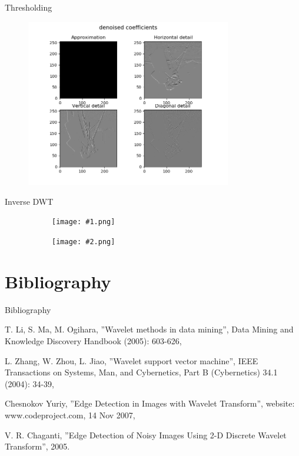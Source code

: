 \documentclass{beamer}
\newcommand{\1}[1]{\mathds{1}\left(#1\right)}
\newenvironment{diagrams}[2]{\begin{figure}[p]
		\begin{subfigure}{.49\textwidth}
			\centering
			\texttt{[image: \#1.png]}
			\caption{}
			\label{#1}
		\end{subfigure}
		\begin{subfigure}{.49\textwidth}
			\centering
			\texttt{[image: \#2.png]}
			\caption{}
			\label{#2}
		\end{subfigure}
	}
	{
	\end{figure}
}
\begin{document}
\begin{frame}{Thresholding}
	\begin{figure}[p]
		\centering
		\includegraphics[width=0.8\textwidth]{denoised_coefficients.png}
	\end{figure}
\end{frame}


\begin{frame}{Inverse DWT}
\begin{diagrams}{original}{edges_detected}
	\centering
\end{diagrams}
\end{frame}

\section{Bibliography}
\begin{frame}{Bibliography}
\begin{thebibliography}{9}
	\beamertemplatearticlebibitems
	T. Li, S. Ma,  M. Ogihara, ''Wavelet methods in data mining'', Data Mining and Knowledge Discovery Handbook (2005): 603-626,
	
	L. Zhang, W. Zhou, L. Jiao, ''Wavelet support vector machine'', IEEE Transactions on Systems, Man, and Cybernetics, Part B (Cybernetics) 34.1 (2004): 34-39,
	
	Chesnokov Yuriy, ''Edge Detection in Images with Wavelet Transform'', website: www.codeproject.com, 14 Nov 2007,
	
	V. R. Chaganti, ''Edge Detection of Noisy Images Using 2-D Discrete Wavelet Transform'', 2005.
	
	
\end{thebibliography}
\end{frame}
\end{document}
